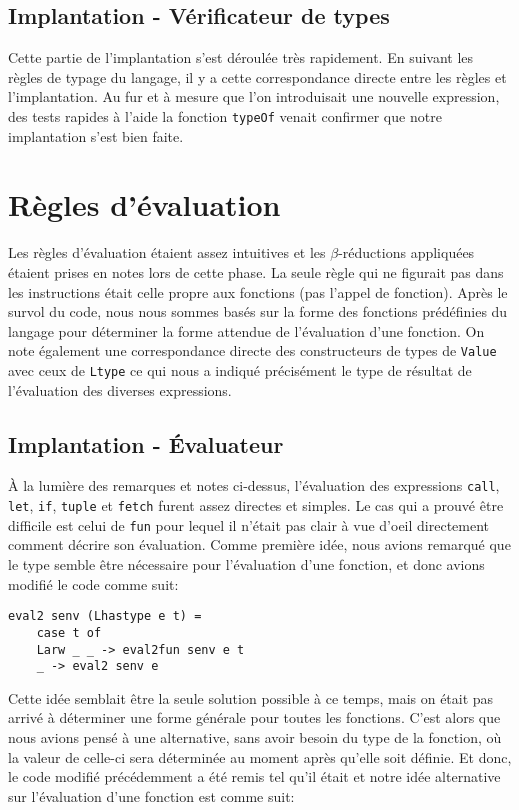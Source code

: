 \documentclass[10pt, titlepage]{article}
\begin{document}
\subsection{Implantation - Vérificateur de types}

Cette partie de l'implantation s'est déroulée très rapidement. En suivant les
règles de typage du langage, il y a cette correspondance directe entre les
règles et l'implantation. Au fur et à mesure que l'on introduisait une nouvelle
expression, des tests rapides à l'aide la fonction \texttt{typeOf} venait
confirmer que notre implantation s'est bien faite.

\section{Règles d'évaluation}

Les règles d'évaluation étaient assez intuitives et les \(\beta\)-réductions
appliquées étaient prises en notes lors de cette phase. La seule règle qui ne
figurait pas dans les instructions était celle propre aux fonctions (pas
l'appel de fonction). Après le survol du code, nous nous sommes basés sur la
forme des fonctions prédéfinies du langage pour déterminer la forme attendue
de l'évaluation d'une fonction. On note également une correspondance
directe des constructeurs de types de \texttt{Value} avec ceux de
\texttt{Ltype} ce qui nous a indiqué précisément le type de résultat de
l'évaluation des diverses expressions.

\subsection{Implantation - Évaluateur}

À la lumière des remarques et notes ci-dessus, l'évaluation des expressions
\texttt{call}, \texttt{let}, \texttt{if}, \texttt{tuple} et \texttt{fetch}
furent assez directes et simples. Le cas qui a prouvé être difficile est celui
de \texttt{fun} pour lequel il n'était pas clair à vue d'oeil directement
comment décrire son évaluation. Comme première idée, nous avions remarqué que
le type semble être nécessaire pour l'évaluation d'une fonction, et donc avions
modifié le code comme suit:

\begin{lstlisting}
eval2 senv (Lhastype e t) =
    case t of
    Larw _ _ -> eval2fun senv e t
    _ -> eval2 senv e
\end{lstlisting}

Cette idée semblait être la seule solution possible à ce temps, mais on était
pas arrivé à déterminer une forme générale pour toutes les fonctions. C'est alors
que nous avions pensé à une alternative, sans avoir besoin du type de la
fonction, où la valeur de celle-ci sera déterminée au moment après qu'elle soit
définie. Et donc, le code modifié précédemment a été remis tel qu'il était
et notre idée alternative sur l'évaluation d'une fonction est comme suit:
\end{document}
